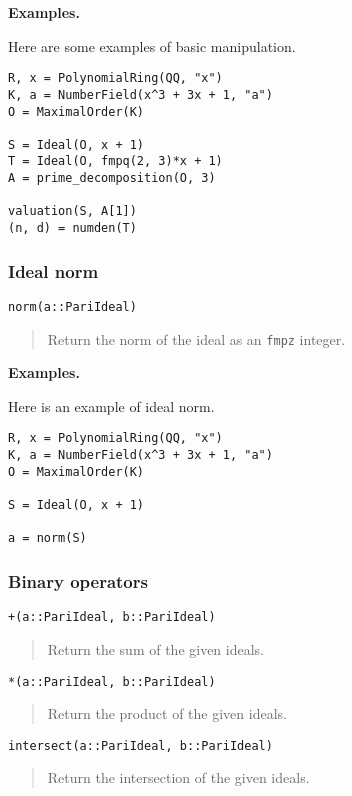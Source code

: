 \documentclass[a4paper,10pt]{article}
\newcommand{\code}{\lstinline}
\newcommand{\desc}[1]{\vspace{-3mm}\begin{quote}#1\end{quote}}
\begin{document}
{{\textbf{Examples.}

Here are some examples of basic manipulation.

\begin{lstlisting}
R, x = PolynomialRing(QQ, "x")
K, a = NumberField(x^3 + 3x + 1, "a")
O = MaximalOrder(K)

S = Ideal(O, x + 1)
T = Ideal(O, fmpq(2, 3)*x + 1)
A = prime_decomposition(O, 3)

valuation(S, A[1])
(n, d) = numden(T)
\end{lstlisting}

\subsubsection{Ideal norm}

\begin{lstlisting}
norm(a::PariIdeal)
\end{lstlisting}

\desc{Return the norm of the ideal as an \code{fmpz} integer.}

\textbf{Examples.}

Here is an example of ideal norm.

\begin{lstlisting}
R, x = PolynomialRing(QQ, "x")
K, a = NumberField(x^3 + 3x + 1, "a")
O = MaximalOrder(K)

S = Ideal(O, x + 1)

a = norm(S)
\end{lstlisting}

\subsubsection{Binary operators}

\begin{lstlisting}
+(a::PariIdeal, b::PariIdeal)
\end{lstlisting}

\desc{Return the sum of the given ideals.}

\begin{lstlisting}
*(a::PariIdeal, b::PariIdeal)
\end{lstlisting}

\desc{Return the product of the given ideals.}

\begin{lstlisting}
intersect(a::PariIdeal, b::PariIdeal)
\end{lstlisting}

\desc{Return the intersection of the given ideals.}

}}
\end{document}
